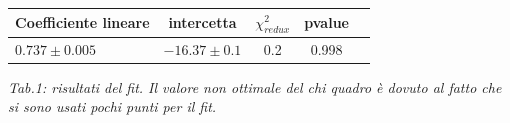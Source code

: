 \documentclass[a4paper]{article}
\begin{document}
	\begin{center} 
		
		\begin{tabular}{lcccc}
			\hline
			\hline
			\textbf{Coefficiente lineare}	& \textbf{intercetta}	& \textbf{$\chi^{2}_{redux}$} & \textbf{pvalue} \\
			\hline
			\hline
			 $0.737	\pm 0.005$	& $-16.37 \pm 0.1	$			& 0.2 &0.998	\\
			
			\hline
			\hline
		\end{tabular}
		\linebreak
		
	\end{center}
	\emph{Tab.1: risultati del fit. Il valore non ottimale del chi quadro è dovuto al fatto che si sono usati pochi punti per il fit.} 
\begin{figure}[H]%
    \centering
    \qquad
    \qquad
    \qquad

\end{figure}
\end{document}
